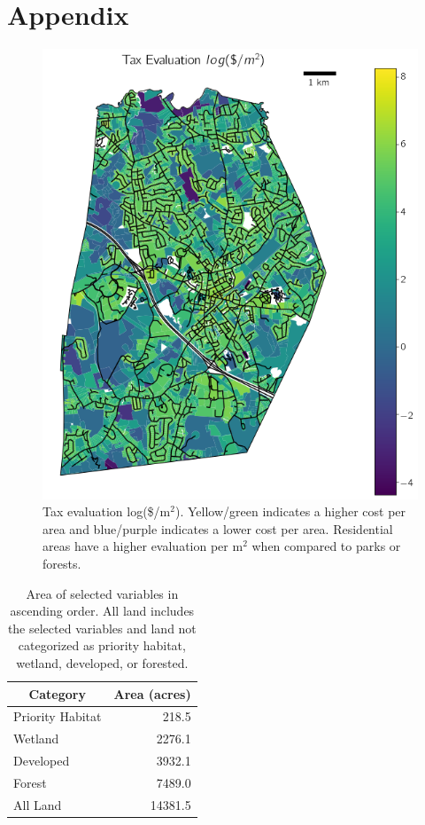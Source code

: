 \documentclass[12pt, stu, floatsintext,table]{apa7}
\begin{document}
\section{Appendix}

\begin{figure}[hbtp]
    \centering
    \includegraphics[width=0.75\linewidth]{figures/landval.png}
    \caption{Tax evaluation log(\$/m$^2$). Yellow/green indicates a higher cost per area and blue/purple indicates a lower cost per area. Residential areas have a higher evaluation per m$^2$ when compared to parks or forests. }
\end{figure}

\begin{table}[]
\centering
\caption{Area of selected variables in ascending order. All land includes the selected variables and land not categorized as priority habitat, wetland, developed, or forested. }
\begin{tabular}{@{}lr@{}}
\toprule
\multicolumn{1}{c}{Category} & \multicolumn{1}{c}{Area (acres)} \\ \midrule
Priority Habitat             & 218.5                            \\
Wetland                      & 2276.1                           \\
Developed                    & 3932.1                           \\
Forest                       & 7489.0                           \\
All Land                     & 14381.5                          \\ \bottomrule
\end{tabular}
\end{table}
\end{document}
